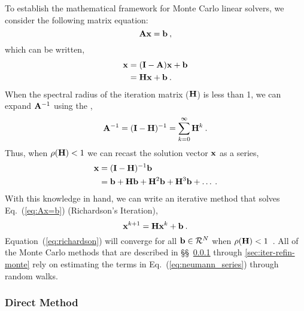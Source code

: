 To establish the mathematical framework for Monte Carlo linear solvers, we
consider the following matrix equation:
\begin{equation}
  \mathbf{A}\mathbf{x} = \mathbf{b}\:,
  \label{eq:Ax=b}
\end{equation}
which can be written,
\begin{equation}
  \begin{split}
    \mathbf{x} &= (\mathbf{I} - \mathbf{A})\mathbf{x} + \mathbf{b}\\
    &= \mathbf{H}\mathbf{x} + \mathbf{b}\:.
  \end{split}
  \label{eq:point_iteration}
\end{equation}
When the spectral radius of the iteration matrix ($\mathbf{H}$) is less than 1, we
can expand $\mathbf{A}^{-1}$ using the ,
\begin{equation}
  \mathbf{A}^{-1} = (\mathbf{I} - \mathbf{H})^{-1} =  \sum_{k=0}^{\infty} \mathbf{H}^k\:.
\end{equation} 
Thus, when $\rho(\mathbf{H}) < 1$ we can recast the solution vector $\mathbf{x}$ as a
series,
\begin{equation}
  \begin{split}
    \mathbf{x} &= (\mathbf{I} - \mathbf{H})^{-1}\mathbf{b}\\
    &= \mathbf{b} + \mathbf{H}\mathbf{b} + \mathbf{H}^2\mathbf{b} + \mathbf{H}^3\mathbf{b} + \ldots\:.
    \label{eq:neumann_series}
  \end{split}
\end{equation}
With this knowledge in hand, we can write an iterative method that solves
Eq.~(\ref{eq:Ax=b}) (Richardson's Iteration),
\begin{equation}
  \mathbf{x}^{k+1} = \mathbf{H}\mathbf{x}^k + \mathbf{b}\:.
  \label{eq:richardson}
\end{equation}
Equation~(\ref{eq:richardson}) will converge for all $\mathbf{b} \in \mathcal{R}^{N}$
when $\rho(\mathbf{H}) < 1$~\cite{kelley_1995}.  All of the Monte Carlo methods that
are described in \S\S~\ref{sec:direct-method} through
\ref{sec:iter-refin-monte} rely on estimating the terms in
Eq.~(\ref{eq:neumann_series}) through random walks.


\subsubsection{Direct Method}
\label{sec:direct-method}

